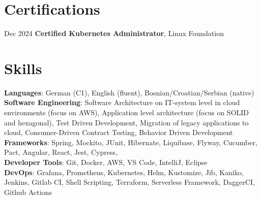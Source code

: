\documentclass[a4paper,12pt]{article}
\makeatletter
\newcommand{\resumeItem}[1]{
	\item\small{
		{#1 \vspace{-2pt}}
	}
}
\newcommand{\resumeProjectHeading}[2]{
	\item
	\begin{tabular*}{0.97\textwidth}{l@{\extracolsep{\fill}}r}
		\small#1 & #2 \\
	\end{tabular*}\vspace{-7pt}
}
\newcommand{\resumeSubHeadingListStart}{\begin{itemize}[leftmargin=0.15in, label={}]}
\newcommand{\resumeSubHeadingListEnd}{\end{itemize}}
\newcommand{\resumeItemListStart}{\begin{itemize}}
\newcommand{\resumeItemListEnd}{\end{itemize}\vspace{-5pt}}
\makeatother
\begin{document}
	
	

	\section{Certifications}
	\begin{itemize}[leftmargin=0.15in, label={}]
		\small {
			\item Dec 2024 \quad \textbf{Certified Kubernetes Administrator}, Linux Foundation
		}
	\end{itemize}
	
	\section{Skills}
	\begin{itemize}[leftmargin=0.15in, label={}]
		\small{
			\item{
				\textbf{Languages}{: German (C1), English (fluent), Bosnian/Croatian/Serbian (native)} \\
				\textbf{Software Engineering}{: Software Architecture on IT-system level in cloud environments (focus on AWS),
					Application level architecture (focus on SOLID and hexagonal), Test Driven Development, Migration of
					legacy applications to cloud, Consumer-Driven Contract Testing, Behavior Driven Development} \\
				\textbf{Frameworks}{: Spring, Mockito, JUnit, Hibernate, Liquibase, Flyway, Cucumber, Pact, Angular, React, Jest, Cypress, } \\
				\textbf{Developer Tools}{: Git, Docker, AWS, VS Code, IntelliJ, Eclipse} \\
				\textbf{DevOps}{: Grafana, Prometheus, Kubernetes, Helm, Kustomize, Jib, Kaniko, Jenkins, Gitlab CI, Shell Scripting, Terraform, Serverless Framework, DaggerCI, Github Actions}
		}}
	\end{itemize}
	
	
\end{document}
